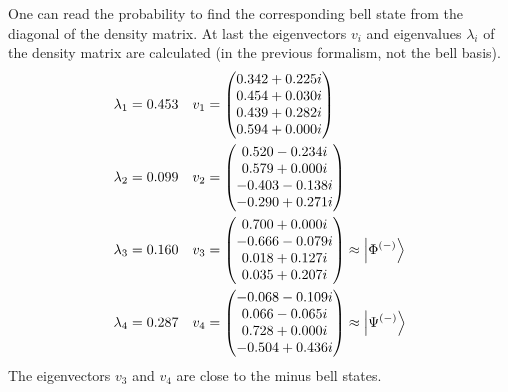 One can read the probability to find the corresponding bell state from the diagonal of the density matrix.
At last the eigenvectors $v_i$ and eigenvalues $\lambda_i$ of the density matrix are calculated (in the previous formalism, not the bell basis).
\begin{align*}
\lambda_1
    &=\evala
    &v_1
    &=\eveca
    \\
\lambda_2
    &=\evalb
    &v_2
    &=\evecb
    \\
\lambda_3
    &=\evalc
    &v_3
    &=\evecc \approx \ket{\Phi^{(-)}}
    \\
\lambda_4
    &=\evald
    &v_4
    &=\evecd \approx \ket{\Psi^{(-)}}
\end{align*}
The eigenvectors $v_3$ and $v_4$ are close to the minus bell states.

